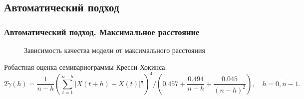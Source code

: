 \documentclass[10pt,pdf,aspectratio=169,hyperref={unicode}]{beamer}
\begin{document}
\subsection{Автоматический подход}

\begin{frame}\frametitle{Автоматический подход. \small{Максимальное расстояние}}
    \begin{figure}[H]
    \caption{Зависимость качества модели от максимального расстояния}
    \label{img:auto-mse-cutoff}
  \end{figure}
  Робастная оценка семивариограммы Кресси-Хокинса:
  \begin{equation}
  \label{eq:cressie}
    2 \tilde{\gamma}(h) = \frac{1}{n - h} (\sum_{t = 1}^{n - h} | X(t + h) - X(t) |^{\frac{1}{2}} )^4 / (0.457 + \frac{0.494}{n - h} + \frac{0.045}{(n - h)^2}), \quad h = \overline{0, n - 1}.
  \end{equation}
\end{frame}
\end{document}
